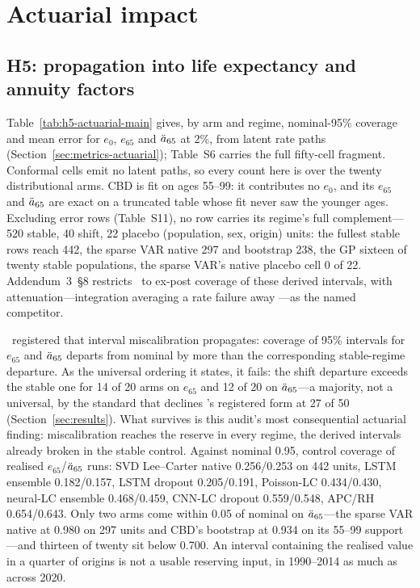\section{Actuarial impact}
\label{sec:actuarial}

\subsection{H5: propagation into life expectancy and annuity factors}


Table~\ref{tab:h5-actuarial-main} gives, by arm and regime, nominal-95\%
coverage and mean error for $e_0$, $e_{65}$ and $\ddot{a}_{65}$ at 2\%, from latent
rate paths (Section~\ref{sec:metrics-actuarial}); Table~S6 carries
the full fifty-cell fragment. Conformal cells emit no latent paths, so every
count here is over the twenty distributional arms. CBD is fit on ages 55--99:
it contributes no $e_0$, and its $e_{65}$ and $\ddot{a}_{65}$ are exact on a
truncated table whose fit never saw the younger ages. Excluding error rows
(Table~S11), no row carries its regime's full complement---520 stable, 40
shift, 22 placebo (population, sex, origin) units: the fullest stable rows
reach 442, the sparse VAR native 297 and bootstrap 238, the GP sixteen of
twenty stable populations, the sparse VAR's native placebo cell 0 of 22.
Addendum~3~\S8 restricts \Hfive\ to ex-post coverage of these derived
intervals, with attenuation---integration averaging a rate failure away
\citep{cairns2011mortality}---as the named competitor.

\Hfive\ registered that interval miscalibration propagates: coverage of 95\%
intervals for $e_{65}$ and $\ddot{a}_{65}$ departs from nominal by more than the
corresponding stable-regime departure. As the universal ordering it states, it fails: the shift departure exceeds the stable one for 14 of 20 arms
on $e_{65}$ and 12 of 20 on $\ddot{a}_{65}$---a majority, not a universal, by the
standard that declines \Htwo's registered form at 27 of 50
(Section~\ref{sec:results}). What survives is this audit's most consequential
actuarial finding: miscalibration reaches the reserve in every regime, the
derived intervals already broken in the stable control. Against nominal 0.95,
control coverage of realised $e_{65}$/$\ddot{a}_{65}$ runs: SVD Lee--Carter native
0.256/0.253 on 442 units, LSTM ensemble 0.182/0.157, LSTM dropout 0.205/0.191,
Poisson-LC 0.434/0.430, neural-LC ensemble 0.468/0.459, CNN-LC dropout
0.559/0.548, APC/RH 0.654/0.643. Only two arms come within 0.05 of nominal on
$\ddot{a}_{65}$---the sparse VAR native at 0.980 on 297 units and CBD's bootstrap at
0.934 on its 55--99 support---and thirteen of twenty sit below 0.700. An
interval containing the realised value in a quarter of origins is not a usable
reserving input, in 1990--2014 as much as across 2020.

